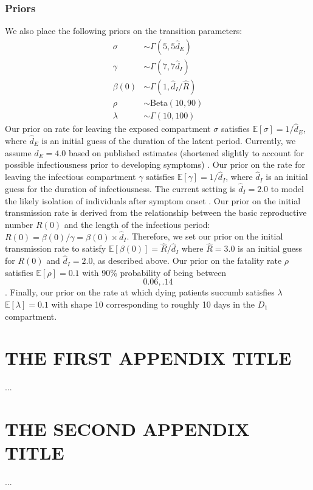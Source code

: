 \documentclass{umassthesis}          %
\newcommand{\Beta}{\text{Beta}}
\newcommand{\E}{\mathbb{E}}
\begin{document}
  \subsection{Priors}
We also place the following priors on the transition parameters: 
\begin{align*}
\sigma &\sim \Gamma(5, 5 \hat{d}_E)\\
\gamma & \sim \Gamma(7, 7 \hat{d}_I) \\
\beta(0) &\sim \Gamma(1, \hat{d}_I/\hat{R}) \\
    \rho &\sim \Beta(10, 90)\\ 
\lambda &\sim \Gamma(10, 100)
\end{align*}
 Our prior on rate for leaving the exposed compartment $\sigma$ satisfies $\E[\sigma] = 1/\hat{d}_E$, where $\hat{d}_E$ is an initial guess of the duration of the latent period. Currently, we assume $\hat{d}_E = 4.0$ based on published estimates (shortened slightly to account for possible infectiousness prior to developing symptoms) \cite{midas}.
 Our prior on the rate for leaving the infectious compartment $\gamma$ satisfies $\E[\gamma] = 1/\hat{d}_I$, where $\hat{d}_I$ is an initial guess for the duration of infectiousness. The current setting is $\hat{d}_I = 2.0$ to model the likely isolation of individuals after symptom onset \cite{heffner2020emotional}. 
Our prior on the initial transmission rate is derived from the relationship between the basic reproductive number $R(0)$ and the length of the infectious period: $R(0) = \beta(0)/\gamma = \beta(0)\times \hat{d}_I$. Therefore, we set our prior on the initial transmission rate to satisfy $\E[\beta(0)] = \hat{R}/\hat{d}_I$ where $\hat{R} = 3.0$ is an initial guess for $R(0)$ and $\hat{d}_I = 2.0$, as described above. 
Our prior on the fatality rate $\rho$ satisfies $\E[\rho] = 0.1$ with 90\% probability of being between \[0.06,.14\].
Finally, our prior on the rate at which dying patients succumb  satisfies $\lambda$ $\E[\lambda] = 0.1$ with shape 10 corresponding to roughly 10 days in the $D_{1}$ compartment.



\appendix
\chapter{THE FIRST APPENDIX TITLE}
...
\chapter{THE SECOND APPENDIX TITLE}
...

\backmatter  %




\end{document}
